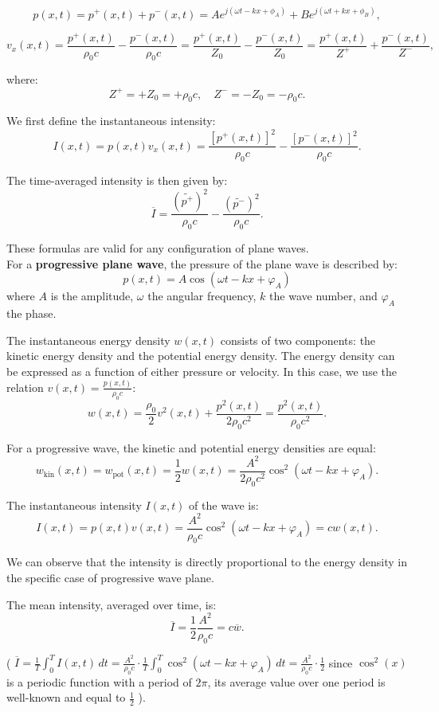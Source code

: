 \documentclass[a4paper]{article}
\begin{document}
\[
p(x, t) = p^+(x, t) + p^-(x, t) = A e^{j(\omega t - kx + \phi_A)} + B e^{j(\omega t + kx + \phi_B)},
\]

\[
v_x(x, t) = \frac{p^+(x, t)}{\rho_0 c} - \frac{p^-(x, t)}{\rho_0 c} = \frac{p^+(x, t)}{Z_0} - \frac{p^-(x, t)}{Z_0} = \frac{p^+(x, t)}{Z^+} + \frac{p^-(x, t)}{Z^-},
\]

where:
\[
Z^+ = +Z_0 = +\rho_0 c, \quad Z^- = -Z_0 = -\rho_0 c.
\]

We first define the instantaneous intensity:
\[
I(x, t) = p(x, t) v_x(x, t) = \frac{[p^+(x, t)]^2}{\rho_0 c} - \frac{[p^-(x, t)]^2}{\rho_0 c}.
\]

The time-averaged intensity is then given by:
\[
\overline{I} = \frac{\left(\widetilde{p^+}\right)^2}{\rho_0 c} - \frac{\left(\widetilde{p^-}\right)^2}{\rho_0 c}.
\]

These formulas are valid for any configuration of plane waves.\\



For a \textbf{progressive plane wave}, the pressure of the plane wave is described by:
\[
p(x, t) = A \cos(\omega t - kx + \varphi_A) 
\]
where \( A \) is the amplitude, \( \omega \) the angular frequency, \( k \) the wave number, and \( \varphi_A \) the phase.


The instantaneous energy density \( w(x, t) \) consists of two components: the kinetic energy density and the potential energy density. The energy density can be expressed as a function of either pressure or velocity. In this case, we use the relation \( v(x, t) = \frac{p(x, t)}{\rho_0 c}\):
\[
w(x, t) = \frac{\rho_0}{2} v^2(x, t) + \frac{p^2(x, t)}{2 \rho_0 c^2} = \frac{p^2(x, t)}{\rho_0 c^2}.
\]

For a progressive wave, the kinetic and potential energy densities are equal:
\[
w_{\text{kin}}(x, t) = w_{\text{pot}}(x, t) = \frac{1}{2} w(x, t) = \frac{A^2}{2 \rho_0 c^2} \cos^2(\omega t - kx + \varphi_A).
\]

The instantaneous intensity \( I(x, t) \) of the wave is:
\[
I(x, t) = p(x, t) v(x, t) = \frac{A^2}{\rho_0 c} \cos^2(\omega t - kx + \varphi_A) = c w(x, t).
\]

We can observe that the intensity is directly proportional to the energy density in the specific case of progressive wave plane.

The mean intensity, averaged over time, is:
\[
\overline{I} = \frac{1}{2} \frac{A^2}{\rho_0 c} = c \overline{w}.
\]

( \(
\overline{I} = \frac{1}{T} \int_0^T I(x, t) \, dt = \frac{A^2}{\rho_0 c} \cdot \frac{1}{T} \int_0^T \cos^2(\omega t - kx + \varphi_A) \, dt = \frac{A^2}{\rho_0 c} \cdot \frac{1}{2}
\) since \(\cos^2(x)\) is a periodic function with a period of \(2\pi\), its average value over one period is well-known and equal to \(\frac{1}{2}\) ).\\
\end{document}
